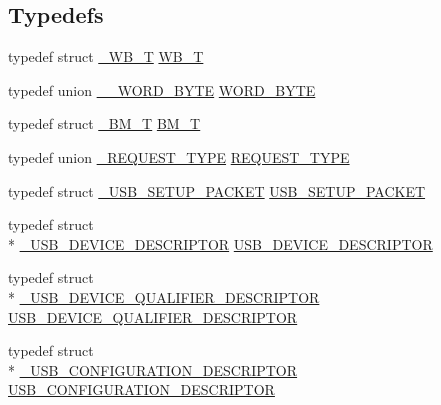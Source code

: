 \subsection*{Typedefs}
\begin{DoxyCompactItemize}
\item 
typedef struct \hyperlink{struct__WB__T}{\-\_\-\-W\-B\-\_\-\-T} \hyperlink{group__USBD__Core_ga4fbe30f5ac133f5bb15c653a19162ae9}{W\-B\-\_\-\-T}
\item 
typedef union \hyperlink{union____WORD__BYTE}{\-\_\-\-\_\-\-W\-O\-R\-D\-\_\-\-B\-Y\-T\-E} \hyperlink{group__USBD__Core_ga340ec8de2973608b96d5cc7379b9561a}{W\-O\-R\-D\-\_\-\-B\-Y\-T\-E}
\item 
typedef struct \hyperlink{struct__BM__T}{\-\_\-\-B\-M\-\_\-\-T} \hyperlink{group__USBD__Core_ga0c191764322e096fa81c1228eb62e63f}{B\-M\-\_\-\-T}
\item 
typedef union \hyperlink{union__REQUEST__TYPE}{\-\_\-\-R\-E\-Q\-U\-E\-S\-T\-\_\-\-T\-Y\-P\-E} \hyperlink{group__USBD__Core_gac85164494feb72445fab7999a3723b6f}{R\-E\-Q\-U\-E\-S\-T\-\_\-\-T\-Y\-P\-E}
\item 
typedef struct \hyperlink{struct__USB__SETUP__PACKET}{\-\_\-\-U\-S\-B\-\_\-\-S\-E\-T\-U\-P\-\_\-\-P\-A\-C\-K\-E\-T} \hyperlink{group__USBD__Core_ga4a940f7627cc7e9f0bb693cc0fce8637}{U\-S\-B\-\_\-\-S\-E\-T\-U\-P\-\_\-\-P\-A\-C\-K\-E\-T}
\item 
typedef struct \\*
\hyperlink{struct__USB__DEVICE__DESCRIPTOR}{\-\_\-\-U\-S\-B\-\_\-\-D\-E\-V\-I\-C\-E\-\_\-\-D\-E\-S\-C\-R\-I\-P\-T\-O\-R} \hyperlink{group__USBD__Core_ga7c2da119cc5c129d253d5fa766c70893}{U\-S\-B\-\_\-\-D\-E\-V\-I\-C\-E\-\_\-\-D\-E\-S\-C\-R\-I\-P\-T\-O\-R}
\item 
typedef struct \\*
\hyperlink{struct__USB__DEVICE__QUALIFIER__DESCRIPTOR}{\-\_\-\-U\-S\-B\-\_\-\-D\-E\-V\-I\-C\-E\-\_\-\-Q\-U\-A\-L\-I\-F\-I\-E\-R\-\_\-\-D\-E\-S\-C\-R\-I\-P\-T\-O\-R} \hyperlink{group__USBD__Core_ga4460a327f0c59c1d44e550efcff1eb00}{U\-S\-B\-\_\-\-D\-E\-V\-I\-C\-E\-\_\-\-Q\-U\-A\-L\-I\-F\-I\-E\-R\-\_\-\-D\-E\-S\-C\-R\-I\-P\-T\-O\-R}
\item 
typedef struct \\*
\hyperlink{struct__USB__CONFIGURATION__DESCRIPTOR}{\-\_\-\-U\-S\-B\-\_\-\-C\-O\-N\-F\-I\-G\-U\-R\-A\-T\-I\-O\-N\-\_\-\-D\-E\-S\-C\-R\-I\-P\-T\-O\-R} \hyperlink{group__USBD__Core_ga196f799666c475a9064909c6e72b9d72}{U\-S\-B\-\_\-\-C\-O\-N\-F\-I\-G\-U\-R\-A\-T\-I\-O\-N\-\_\-\-D\-E\-S\-C\-R\-I\-P\-T\-O\-R}

\end{DoxyCompactItemize}
